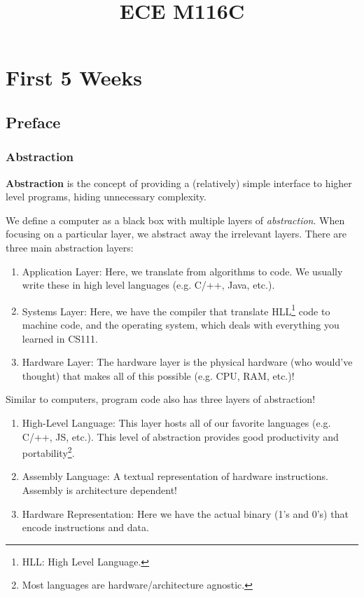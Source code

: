 \documentclass{report}
\title{ECE M116C}
\date{}
\newcommand{\definition}[2]{\begin{tcolorbox}[title={Definition: #1}]{#2}\end{tcolorbox}}
\begin{document}
\maketitle

\tableofcontents
\newpage

\part{First 5 Weeks}
\chapter{Preface}
\section{Abstraction}
\definition{Abstraction}{
  \textbf{Abstraction} is the concept of providing a (relatively) simple interface to higher level
  programs, hiding unnecessary complexity.
}

We define a computer as a black box with multiple layers of \textit{abstraction}. When focusing on a
particular layer, we abstract away the irrelevant layers. There are three main abstraction layers:

\begin{enumerate}[label=\textit{(\roman*)}]
\item Application Layer: Here, we translate from algorithms to code. We usually write these in high
  level languages (e.g. C/++, Java, etc.).
\item Systems Layer: Here, we have the compiler that translate HLL\footnote{HLL: High Level
    Language.} code to machine code, and the operating system, which deals with everything you
  learned in CS111.
\item Hardware Layer: The hardware layer is the physical hardware (who would've thought) that makes
  all of this possible (e.g. CPU, RAM, etc.)!
\end{enumerate}

Similar to computers, program code also has three layers of abstraction!

\begin{enumerate}[label=\textit{(\roman*)}]
\item High-Level Language: This layer hosts all of our favorite languages (e.g. C/++, JS,
  etc.). This level of abstraction provides good productivity and portability\footnote{Most
    languages are hardware/architecture agnostic.}. 
\item Assembly Language: A textual representation of hardware instructions. Assembly is architecture
  dependent!
\item Hardware Representation: Here we have the actual binary (1's and 0's) that encode instructions
  and data.  
\end{enumerate}
\end{document}
